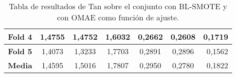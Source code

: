 \begin{table}[H]
{\begin{tabular}{|crrrrrr|}
\multicolumn{1}{|c|}{\textbf{Fold 4}} & \multicolumn{1}{c|}{1,4755}            & \multicolumn{1}{c|}{1,4752}              & \multicolumn{1}{c|}{1,6032}          & \multicolumn{1}{c|}{0,2662}            & \multicolumn{1}{c|}{0,2608}              & 0,1719                             \\ \hline
\multicolumn{1}{|c|}{\textbf{Fold 5}} & \multicolumn{1}{c|}{1,4073}            & \multicolumn{1}{c|}{1,3233}              & \multicolumn{1}{c|}{1,7703}          & \multicolumn{1}{c|}{0,2891}            & \multicolumn{1}{c|}{0,2896}              & 0,1562                             \\ \hline
\multicolumn{1}{|c|}{\textbf{Media}}  & \multicolumn{1}{c|}{1,4595}           & \multicolumn{1}{c|}{1,5016}             & \multicolumn{1}{c|}{1,7807}         & \multicolumn{1}{c|}{0,2950}           & \multicolumn{1}{c|}{0,2780}             & 0,1822                            \\ \hline
\end{tabular}%
}
\caption{Tabla de resultados de Tan sobre el conjunto con BL-SMOTE y con OMAE como función de ajuste.}\label{tablaTANconBLSMOTEconOMAE}

\end{table}


